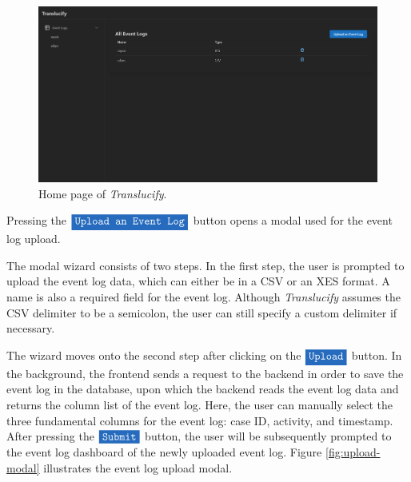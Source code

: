\begin{figure}[H]
    \centering
    \includegraphics[width=\textwidth]{figures/screenshots/home.png}
    \caption{Home page of \emph{Translucify}.}
    \label{fig:home-page}
\end{figure}

Pressing the $\colorbox{NavyBlue}{\textcolor{white}{\texttt{Upload an Event Log}}}$ button opens a modal used for the event log upload.

The modal wizard consists of two steps. In the first step, the user is prompted to upload the event log data, which can either be in a CSV or an XES format. A name is also a required field for the event log. Although \emph{Translucify} assumes the CSV delimiter to be a semicolon, the user can still specify a custom delimiter if necessary.

The wizard moves onto the second step after clicking on the $\colorbox{NavyBlue}{\textcolor{white}{\texttt{Upload}}}$ button. In the background, the frontend sends a request to the backend in order to save the event log in the database, upon which the backend reads the event log data and returns the column list of the event log. Here, the user can manually select the three fundamental columns for the event log: case ID, activity, and timestamp. After pressing the $\colorbox{NavyBlue}{\textcolor{white}{\texttt{Submit}}}$ button, the user will be subsequently prompted to the event log dashboard of the newly uploaded event log. Figure \ref{fig:upload-modal} illustrates the event log upload modal.

